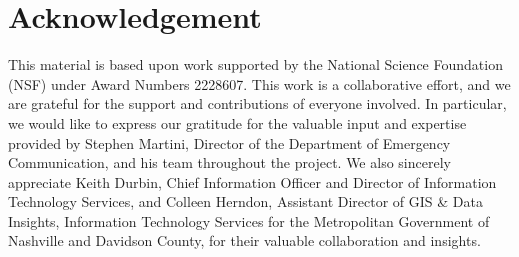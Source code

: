 \section{Acknowledgement}


This material is based upon work supported by the National Science Foundation (NSF) under Award Numbers 2228607. 
This work is a collaborative effort, and we are grateful for the support and contributions of everyone involved. In particular, we would like to express our gratitude for the valuable input and expertise provided by Stephen Martini, Director of the Department of Emergency Communication, and his team throughout the project. We also sincerely appreciate Keith Durbin, Chief Information Officer and Director of Information Technology Services, and Colleen Herndon, Assistant Director of GIS \& Data Insights, Information Technology Services for the Metropolitan Government of Nashville and Davidson County, for their valuable collaboration and insights. 
